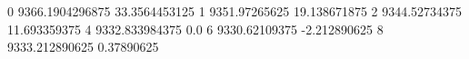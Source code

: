 0 9366.1904296875 33.3564453125
1 9351.97265625 19.138671875
2 9344.52734375 11.693359375
4 9332.833984375 0.0
6 9330.62109375 -2.212890625
8 9333.212890625 0.37890625
